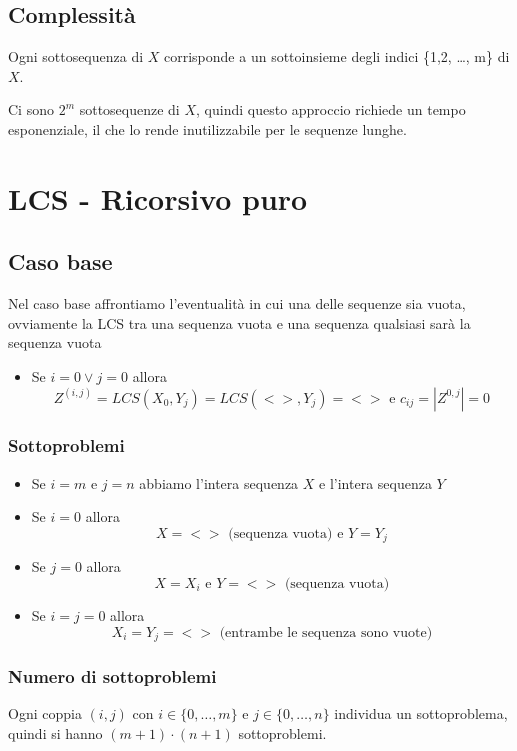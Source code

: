 \subsection{Complessità}
Ogni sottosequenza di $X$ corrisponde a un sottoinsieme degli indici \{1,2, \dots, m\} di $X$.

Ci sono $2^m$ sottosequenze di $X$, quindi questo approccio richiede un tempo esponenziale, il che lo rende inutilizzabile per le sequenze lunghe.

\newpage
\section{LCS - Ricorsivo puro}

\subsection{Caso base}
Nel caso base affrontiamo l'eventualità in cui una delle sequenze sia vuota, ovviamente la LCS tra una sequenza vuota e una sequenza qualsiasi sarà la sequenza vuota


\begin{itemize}
    \item Se $i=0 \lor j=0$ allora 
        $$Z^{(i,j)}=LCS(X_0,Y_j) = LCS(<>,Y_j)=<> \text{ e }  c_{ij}=|Z^{0,j}|=0$$
\end{itemize}

\subsubsection{Sottoproblemi}
\begin{itemize}
    \item Se $i=m$ e $j=n$ abbiamo l'intera sequenza $X$ e l'intera sequenza $Y$
    \item Se $i=0$ allora 
        $$X = <> \text{ (sequenza vuota) e } Y=Y_j$$
    \item Se $j=0$ allora 
        $$X=X_i \text{ e } Y=<> \text{ (sequenza vuota)}$$
    \item Se $i=j=0$ allora 
        $$X_i = Y_j = <> \text{ (entrambe le sequenza sono vuote)}$$
\end{itemize}


\subsubsection{Numero di sottoproblemi}
Ogni coppia $(i,j)$ con $i \in \{0, \dots, m\}$ e $j \in \{0, \dots, n\}$ individua un sottoproblema, quindi si hanno $(m+1) \cdot (n+1)$ sottoproblemi.

